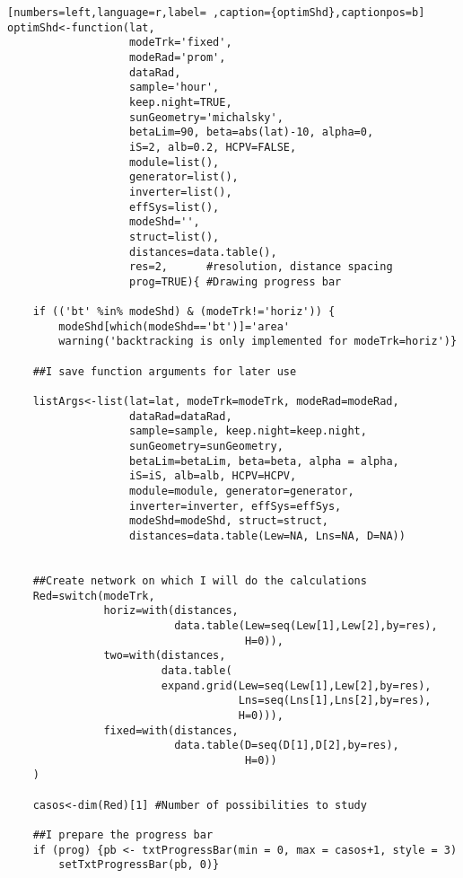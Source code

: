 \begin{lstlisting}[numbers=left,language=r,label= ,caption={optimShd},captionpos=b]
optimShd<-function(lat,
                   modeTrk='fixed', 
                   modeRad='prom', 
                   dataRad,
                   sample='hour',
                   keep.night=TRUE,
                   sunGeometry='michalsky',
                   betaLim=90, beta=abs(lat)-10, alpha=0,
                   iS=2, alb=0.2, HCPV=FALSE,
                   module=list(), 
                   generator=list(),
                   inverter=list(), 
                   effSys=list(), 
                   modeShd='',    
                   struct=list(), 
                   distances=data.table(),
                   res=2,      #resolution, distance spacing
                   prog=TRUE){ #Drawing progress bar

    if (('bt' %in% modeShd) & (modeTrk!='horiz')) {
        modeShd[which(modeShd=='bt')]='area'
        warning('backtracking is only implemented for modeTrk=horiz')}

    ##I save function arguments for later use

    listArgs<-list(lat=lat, modeTrk=modeTrk, modeRad=modeRad,
                   dataRad=dataRad,
                   sample=sample, keep.night=keep.night,
                   sunGeometry=sunGeometry,
                   betaLim=betaLim, beta=beta, alpha = alpha,
                   iS=iS, alb=alb, HCPV=HCPV,
                   module=module, generator=generator,
                   inverter=inverter, effSys=effSys,
                   modeShd=modeShd, struct=struct,
                   distances=data.table(Lew=NA, Lns=NA, D=NA))


    ##Create network on which I will do the calculations
    Red=switch(modeTrk,
               horiz=with(distances,
                          data.table(Lew=seq(Lew[1],Lew[2],by=res),
                                     H=0)),
               two=with(distances,
                        data.table(
                        expand.grid(Lew=seq(Lew[1],Lew[2],by=res),
                                    Lns=seq(Lns[1],Lns[2],by=res),
                                    H=0))),
               fixed=with(distances,
                          data.table(D=seq(D[1],D[2],by=res),
                                     H=0))
    )

    casos<-dim(Red)[1] #Number of possibilities to study

    ##I prepare the progress bar
    if (prog) {pb <- txtProgressBar(min = 0, max = casos+1, style = 3)
        setTxtProgressBar(pb, 0)}


\end{lstlisting}
